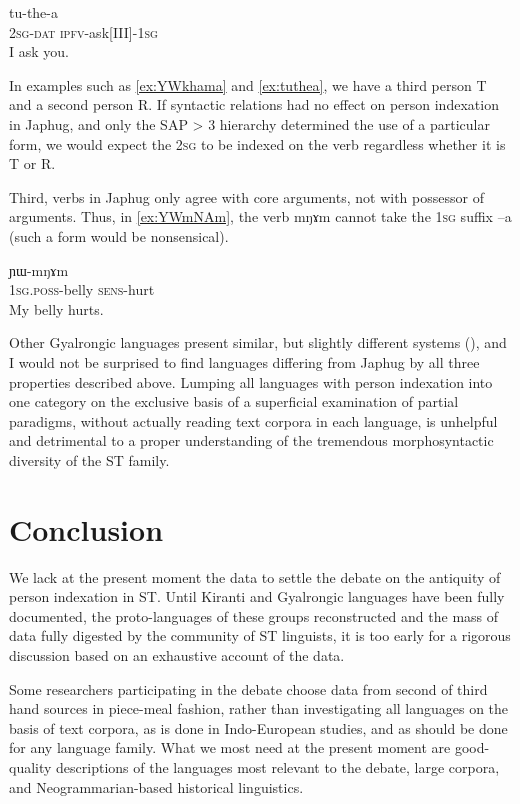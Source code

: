 \documentclass[oldfontcommands,oneside,a4paper,11pt]{article}
\newcommand{\ipa}[1]{{\phon \mbox{#1}}} %
\begin{document}
\begin{exe}
\ex \label{ex:tuthea}
\gll \ipa{nɤ-ɕki} 	\ipa{tu-the-a} \\
\textsc{2sg-dat} \textsc{ipfv}-ask[III]-\textsc{1sg} \\
\glt I ask you.
\end{exe}

In examples such as \ref{ex:YWkhama} and \ref{ex:tuthea}, we have a third person T and a second person R. If syntactic relations had no effect on person indexation in Japhug, and only the SAP > 3 hierarchy determined the use of a particular form, we would expect the \textsc{2sg} to be indexed on the verb regardless whether it is T or R.

Third, verbs in Japhug only agree with core arguments, not with possessor of arguments. Thus, in \ref{ex:YWmNAm}, the verb \ipa{mŋɤm} cannot take the \textsc{1sg} suffix \ipa{--a} (such a form would be nonsensical).

\begin{exe}
\ex \label{ex:YWmNAm}
\gll \ipa{a-xtu} 	\ipa{ɲɯ-mŋɤm} \\
\textsc{1sg.poss}-belly \textsc{sens}-hurt \\
\glt My belly hurts.
\end{exe}

Other Gyalrongic languages present similar, but slightly different systems (\citealt{lai14person}), and I would not be surprised to find languages differing from Japhug by all three properties described above. Lumping all languages with person indexation into one category on the exclusive basis of a superficial examination of partial paradigms, without actually reading text corpora in each  language, is unhelpful and detrimental to a proper understanding of the tremendous morphosyntactic diversity of the ST family.

\section{Conclusion}

We lack at the present moment the data to settle the debate on the antiquity of person indexation in ST. Until Kiranti and Gyalrongic languages have been fully documented, the proto-languages of these groups reconstructed and the mass of data fully digested by the community of ST linguists, it is too early for a rigorous discussion based on an exhaustive account of the data. 

Some researchers participating in the debate choose data from second of third hand sources in piece-meal fashion, rather than investigating all languages on the basis of text corpora, as is done in Indo-European studies, and as should be done for any language family. What we most need at the present moment are good-quality descriptions of the languages most relevant to the debate, large corpora, and Neogrammarian-based historical linguistics.

\charis


\end{document}

